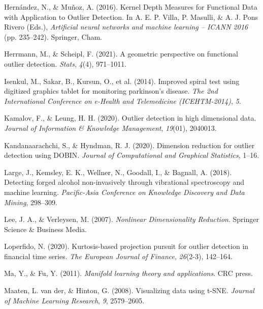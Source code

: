 \documentclass[
  10pt]{article}
\newlength{\cslhangindent}
\newlength{\cslentryspacingunit} %
\newenvironment{CSLReferences}[2] %
 {%
  \setlength{\parindent}{0pt}
  \ifodd #1
  \let\oldpar\par
  \def\par{\hangindent=\cslhangindent\oldpar}
  \fi
  \setlength{\parskip}{#2\cslentryspacingunit}
 }%
 {}
\begin{document}
\begin{CSLReferences}{1}{0}
\leavevmode{}%
Hernández, N., \& Muñoz, A. (2016). Kernel {D}epth {M}easures for {F}unctional {D}ata with {A}pplication to {O}utlier {D}etection. In A. E. P. Villa, P. Masulli, \& A. J. Pons Rivero (Eds.), \emph{Artificial neural networks and machine learning -- {ICANN} 2016} (pp. 235--242). Springer, Cham.

\leavevmode{}%
Herrmann, M., \& Scheipl, F. (2021). A geometric perspective on functional outlier detection. \emph{Stats}, \emph{4}(4), 971--1011.

\leavevmode{}%
Isenkul, M., Sakar, B., Kursun, O., et al. (2014). Improved spiral test using digitized graphics tablet for monitoring parkinson's disease. \emph{The 2nd International Conference on e-Health and Telemedicine (ICEHTM-2014)}, \emph{5}.

\leavevmode{}%
Kamalov, F., \& Leung, H. H. (2020). Outlier detection in high dimensional data. \emph{Journal of Information \& Knowledge Management}, \emph{19}(01), 2040013.

\leavevmode{}%
Kandanaarachchi, S., \& Hyndman, R. J. (2020). Dimension reduction for outlier detection using {DOBIN}. \emph{Journal of Computational and Graphical Statistics}, 1--16.

\leavevmode{}%
Large, J., Kemsley, E. K., Wellner, N., Goodall, I., \& Bagnall, A. (2018). Detecting forged alcohol non-invasively through vibrational spectroscopy and machine learning. \emph{Pacific-Asia Conference on Knowledge Discovery and Data Mining}, 298--309.

\leavevmode{}%
Lee, J. A., \& Verleysen, M. (2007). \emph{Nonlinear {Dimensionality} {Reduction}}. Springer Science \& Business Media.

\leavevmode{}%
Loperfido, N. (2020). Kurtosis-based projection pursuit for outlier detection in financial time series. \emph{The European Journal of Finance}, \emph{26}(2-3), 142--164.

\leavevmode{}%
Ma, Y., \& Fu, Y. (2011). \emph{Manifold learning theory and applications}. CRC press.

\leavevmode{}%
Maaten, L. van der, \& Hinton, G. (2008). Visualizing data using t-{SNE}. \emph{Journal of Machine Learning Research}, \emph{9}, 2579--2605.


\end{CSLReferences}
\end{document}
